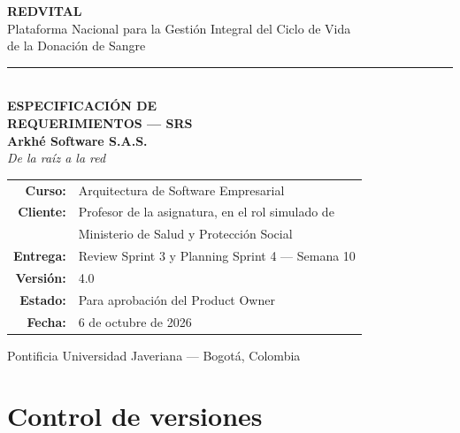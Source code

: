 \documentclass[11pt,a4paper]{article}
\begin{document}
\begin{titlepage}
\centering
\thispagestyle{empty}
\vspace*{1.8cm}


{\Huge\bfseries\color{vinotinto} REDVITAL}\\[0.5cm]
{\large\color{vinotinto} Plataforma Nacional para la Gestión Integral del Ciclo de Vida\\ de la Donación de Sangre}\\[1.7cm]

{\color{vinotinto}\rule{0.45\textwidth}{1.2pt}}\\[1.7cm]

{\LARGE\bfseries ESPECIFICACIÓN DE}\\[0.4cm]
{\LARGE\bfseries REQUERIMIENTOS — SRS}\\[2.0cm]

{\large\bfseries Arkhé Software S.A.S.}\\[0.3cm]
{\itshape De la raíz a la red}\\[1.9cm]

\begin{tabular}{r l}
\textbf{Curso:} & Arquitectura de Software Empresarial \\
\textbf{Cliente:} & Profesor de la asignatura, en el rol simulado de \\
 & Ministerio de Salud y Protección Social \\
\textbf{Entrega:} & Review Sprint 3 y Planning Sprint 4 — Semana 10 \\
\textbf{Versión:} & 4.0 \\
\textbf{Estado:} & Para aprobación del Product Owner \\
\textbf{Fecha:} & 6 de octubre de 2026 \\
\end{tabular}

\vfill
{\small\color{grisTexto} Pontificia Universidad Javeriana — Bogotá, Colombia}
\end{titlepage}

\section*{Control de versiones}
\end{document}

